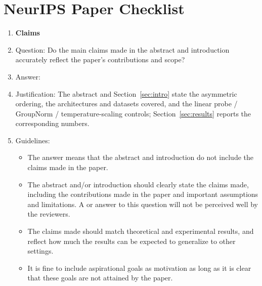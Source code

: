 \documentclass{article}
\begin{document}
\newpage

\section*{NeurIPS Paper Checklist}

\begin{enumerate}

\item {\bf Claims}
    \item[] Question: Do the main claims made in the abstract and introduction accurately reflect the paper's contributions and scope?
    \item[] Answer: \answerYes{}
    \item[] Justification: The abstract and Section~\ref{sec:intro} state the asymmetric ordering, the architectures and datasets covered, and the linear probe / GroupNorm / temperature-scaling controls; Section~\ref{sec:results} reports the corresponding numbers.
    \item[] Guidelines:
    \begin{itemize}
        \item The answer \answerNA{} means that the abstract and introduction do not include the claims made in the paper.
        \item The abstract and/or introduction should clearly state the claims made, including the contributions made in the paper and important assumptions and limitations. A \answerNo{} or \answerNA{} answer to this question will not be perceived well by the reviewers.
        \item The claims made should match theoretical and experimental results, and reflect how much the results can be expected to generalize to other settings.
        \item It is fine to include aspirational goals as motivation as long as it is clear that these goals are not attained by the paper.
    \end{itemize}


\end{enumerate}
\end{document}
